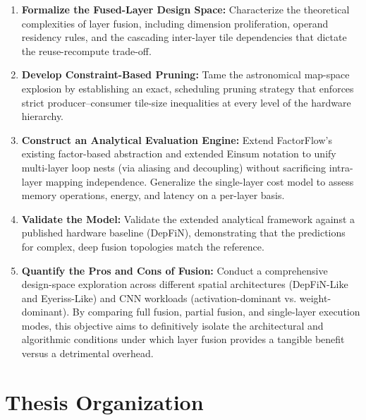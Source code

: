 \begin{enumerate}
  \item \textbf{Formalize the Fused-Layer Design Space:} Characterize the
        theoretical complexities of layer fusion, including dimension proliferation,
        operand residency rules, and the cascading inter-layer tile dependencies
        that dictate the reuse-recompute trade-off.

  \item \textbf{Develop Constraint-Based Pruning:} Tame the astronomical
        map-space explosion by establishing an exact, scheduling pruning
        strategy that enforces strict producer--consumer tile-size inequalities at
        every level of the hardware hierarchy.

  \item \textbf{Construct an Analytical Evaluation Engine:} Extend FactorFlow's
        existing factor-based abstraction and extended Einsum notation to unify
        multi-layer loop nests (via aliasing and decoupling) without sacrificing
        intra-layer mapping independence. Generalize the single-layer cost model to assess
        memory operations, energy, and latency on a per-layer basis.

  \item \textbf{Validate the Model:} Validate the extended analytical framework
        against a published hardware baseline (DepFiN), demonstrating that the
        predictions for complex, deep fusion topologies match the reference.

  \item \textbf{Quantify the Pros and Cons of Fusion:} Conduct a comprehensive
        design-space exploration across different spatial architectures (DepFiN-Like
        and Eyeriss-Like) and CNN workloads (activation-dominant vs. weight-dominant).
        By comparing full fusion, partial fusion, and single-layer execution modes,
        this objective aims to definitively isolate the architectural and algorithmic
        conditions under which layer fusion provides a tangible benefit versus
        a detrimental overhead.
\end{enumerate}

\section{Thesis Organization}
\label{sec:intro-organisation}

